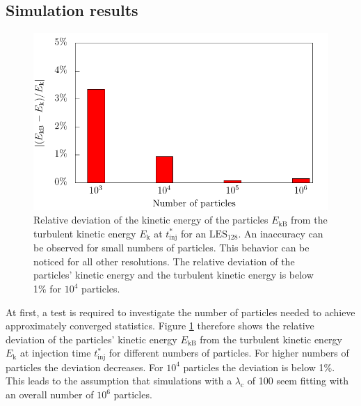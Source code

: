 \documentclass[11pt,a4paper,openany,oneside,parskip=half*]{article}
\begin{document}
\subsection{Simulation results}
\begin{figure}[h]
    \centering
    \begin{minipage}{0.5\textwidth}
        \centering
 	   \includegraphics[width=\linewidth]{./Abbildungen/kineticEnergy_numberOfParticles.pdf}
    \end{minipage}%
        \begin{minipage}{0.5\textwidth}
        \centering
        \caption{Relative deviation of the kinetic energy of the particles  $E_\mathrm{kB}$ from the turbulent kinetic energy $E_\mathrm{k}$ at $t^*_\mathrm{inj}$ for an $\mathrm{LES_{128}}$. An inaccuracy can be observed for small numbers of particles. This behavior can be noticed for all other resolutions. The relative deviation of the particles' kinetic energy and the turbulent kinetic energy is below 1\% for $10^4$ particles.}
	\label{kineticEnergy_numberofparticles}
    \end{minipage}
    \end{figure}
At first, a test is required to investigate the number of particles needed to achieve approximately converged statistics.
Figure \ref{kineticEnergy_numberofparticles} therefore shows the relative deviation of the particles' kinetic energy $E_\mathrm{kB}$ from the turbulent kinetic energy $E_\mathrm{k}$ at injection time $t^*_\mathrm{inj}$ for different numbers of particles. For higher numbers of particles the deviation decreases. For $10^4$ particles the deviation is below 1\%.
This leads to the assumption that simulations with a $\lambda_\mathrm{c}$ of 100 seem fitting with an overall number of $10^6$ particles. 
\end{document}
